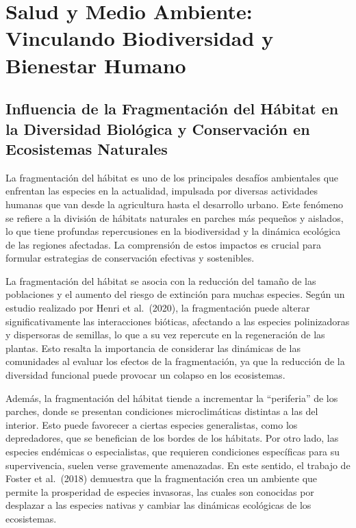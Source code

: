 \documentclass[
  letterpaper,
  DIV=11,
  numbers=noendperiod,
  oneside]{scrreprt}
\begin{document}
\chapter{Salud y Medio Ambiente: Vinculando Biodiversidad y Bienestar
Humano}\label{salud-y-medio-ambiente-vinculando-biodiversidad-y-bienestar-humano}

\section{Influencia de la Fragmentación del Hábitat en la Diversidad
Biológica y Conservación en Ecosistemas
Naturales}\label{influencia-de-la-fragmentaciuxf3n-del-huxe1bitat-en-la-diversidad-bioluxf3gica-y-conservaciuxf3n-en-ecosistemas-naturales}

La fragmentación del hábitat es uno de los principales desafíos
ambientales que enfrentan las especies en la actualidad, impulsada por
diversas actividades humanas que van desde la agricultura hasta el
desarrollo urbano. Este fenómeno se refiere a la división de hábitats
naturales en parches más pequeños y aislados, lo que tiene profundas
repercusiones en la biodiversidad y la dinámica ecológica de las
regiones afectadas. La comprensión de estos impactos es crucial para
formular estrategias de conservación efectivas y sostenibles.

La fragmentación del hábitat se asocia con la reducción del tamaño de
las poblaciones y el aumento del riesgo de extinción para muchas
especies. Según un estudio realizado por Henri et al.~(2020), la
fragmentación puede alterar significativamente las interacciones
bióticas, afectando a las especies polinizadoras y dispersoras de
semillas, lo que a su vez repercute en la regeneración de las plantas.
Esto resalta la importancia de considerar las dinámicas de las
comunidades al evaluar los efectos de la fragmentación, ya que la
reducción de la diversidad funcional puede provocar un colapso en los
ecosistemas.

Además, la fragmentación del hábitat tiende a incrementar la
``periferia'' de los parches, donde se presentan condiciones
microclimáticas distintas a las del interior. Esto puede favorecer a
ciertas especies generalistas, como los depredadores, que se benefician
de los bordes de los hábitats. Por otro lado, las especies endémicas o
especialistas, que requieren condiciones específicas para su
supervivencia, suelen verse gravemente amenazadas. En este sentido, el
trabajo de Foster et al.~(2018) demuestra que la fragmentación crea un
ambiente que permite la prosperidad de especies invasoras, las cuales
son conocidas por desplazar a las especies nativas y cambiar las
dinámicas ecológicas de los ecosistemas.
\end{document}
